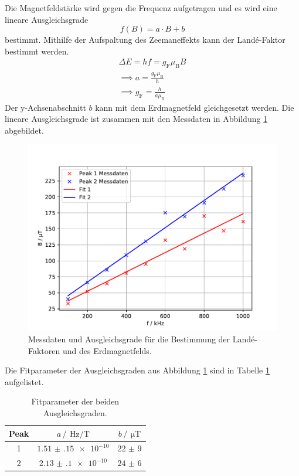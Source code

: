 \FloatBarrier
Die Magnetfeldstärke wird gegen die Frequenz aufgetragen und es wird eine lineare Ausgleichsgrade
\begin{equation*}
  \label{eq:lin_fit}
  f(B)=a\cdot B + b
\end{equation*}
bestimmt. 
Mithilfe der Aufspaltung des Zeemaneffekts kann der Landé-Faktor bestimmt werden.
\begin{gather*}
  \Delta E = hf = g_{\text{F}} \mu_{\text{B}} B\\
  \implies a = \frac{g_{\text{F}} \mu_{\text{B}}}{h} \\
  \implies g_{\text{F}} = \frac{h}{a\mu_{\text{B}}}
\end{gather*}
Der y-Achsenabschnitt $b$ kann mit dem Erdmagnetfeld gleichgesetzt werden. Die lineare Ausgleichsgrade ist zusammen mit 
den Messdaten in Abbildung \ref{fig:Fit_Messdaten} abgebildet.
\FloatBarrier
\begin{figure}
  \centering
  \includegraphics[width = \textwidth,keepaspectratio]{figure/Messdaten_Fit.pdf}
  \caption{Messdaten und Ausgleichsgrade für die Bestimmung der Landé-Faktoren und des Erdmagnetfelds.}
  \label{fig:Fit_Messdaten}
\end{figure}
\FloatBarrier
Die Fitparameter der Ausgleichsgraden aus Abbildung \ref{fig:Fit_Messdaten} sind in Tabelle \ref{tab:FitParams} aufgelistet.
\begin{table}
  \centering
  \caption{Fitparameter der beiden Ausgleichsgraden.}
  \label{tab:FitParams}
  \begin{tabular}{c c c}
    \toprule
    Peak&$a\,/\,\SI{}{\hertz\per\tesla}$&$b \,/\,\SI{}{\micro\tesla}$\\
    \midrule
    1&$\num{1.51(15)e-10}$&$\num{22(9)}$\\
    2&$\num{2.13(10)e-10}$&$\num{24(6)}$\\
    \bottomrule
  \end{tabular}
\end{table}
